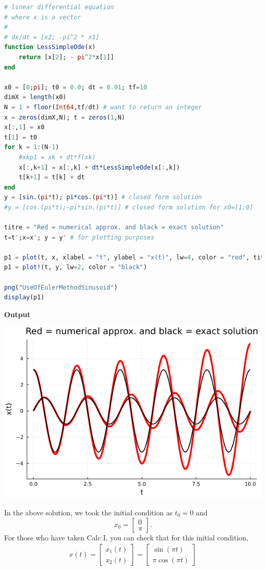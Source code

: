 \begin{lstlisting}[language=Julia,style=mystyle]
# linear differential equation
# where x is a vector
#
# dx/dt = [x2; -pi^2 * x1]
function LessSimpleOde(x)
    return [x[2]; - pi^2*x[1]]
end

x0 = [0;pi]; t0 = 0.0; dt = 0.01; tf=10
dimX = length(x0)
N = 1 + floor(Int64,tf/dt) # want to return an integer
x = zeros(dimX,N); t = zeros(1,N)
x[:,1] = x0
t[1] = t0
for k = 1:(N-1)
    #xkp1 = xk + dt*f(xk)
    x[:,k+1] = x[:,k] + dt*LessSimpleOde(x[:,k])
    t[k+1] = t[k] + dt
end
y = [sin.(pi*t); pi*cos.(pi*t)] # closed form solution
#y = [cos.(pi*t);-pi*sin.(pi*t)] # closed form solution for x0=[1;0]

titre = "Red = numerical approx. and black = exact solution"
t=t';x=x'; y = y' # for plotting purposes

p1 = plot(t, x, xlabel = "t", ylabel = "x(t)", lw=4, color = "red", title = titre, legend = false)
p1 = plot!(t, y, lw=2, color = "black")

png("UseOfEulerMethodSinusoid")
display(p1)
\end{lstlisting}
\textbf{Output} 
\begin{center}
\includegraphics[width=0.6\columnwidth]{graphics/Chap09/UseOfEulerMethodSinusoid.png}
\end{center}
In the above solution, we took the initial condition as $t_0=0$ and
$$ x_0 = \begin{bmatrix} 0 \\ \pi \end{bmatrix}.
$$
For those who have taken Calc I, you can check that for this initial condition, 
\begin{align*}
    x(t) = \left[ \begin{array}{ll} x_1(t) \\ x_2(t) \end{array} \right]= \left[ \begin{array}{ll} \sin(\pi t) \\\pi \cos(\pi t) \end{array} \right]
\end{align*}
